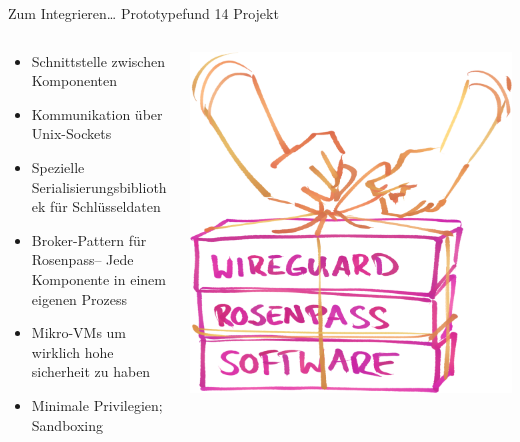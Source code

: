 \documentclass{rosenpass-beamer}
\begin{document}
\begin{frame}{Zum Integrieren… Prototypefund 14 Projekt}
\begin{columns}[c]
\begin{column}{0.7\textwidth}
  \begin{itemize}
    \item Schnittstelle zwischen Komponenten
    \item Kommunikation über Unix-Sockets
    \item Spezielle Serialisierungsbibliothek für Schlüsseldaten\footnotemark
    \item Broker-Pattern für Rosenpass– Jede Komponente in einem eigenen Prozess
    \item Mikro-VMs um wirklich hohe sicherheit zu haben
    \item Minimale Privilegien; Sandboxing
  \end{itemize}
\end{column}

\begin{column}{0.2\textwidth}
\includegraphics[width=\linewidth]{graphics/rosenpass in anderen apps.png}


\end{column}
\end{columns}
\end{frame}
\end{document}
